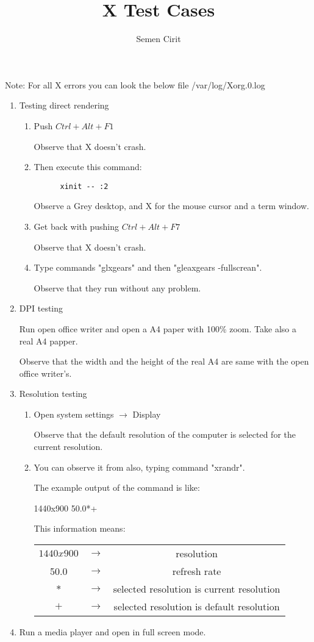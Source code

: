 \documentclass[a4paper,10pt]{article}
\title{X Test Cases}
\author{Semen Cirit}
\begin{document}
\maketitle

 Note:	
  	For all X errors you can look the below file
	/var/log/Xorg.0.log  
\begin{enumerate}
  \item Testing direct rendering
    \begin{enumerate}
    \item  Push $Ctrl+Alt+F1$
    
	    Observe that X doesn't crash.
    \item  Then execute this command:
	  \begin{verbatim}
	  xinit -- :2
	  \end{verbatim}
	  Observe a Grey desktop, and X for the mouse cursor and a term window.
    \item Get back with pushing $Ctrl+Alt+F7$
    
	  Observe that X doesn't crash.
    \item Type commands "glxgears" and then "gleaxgears -fullscrean".

	  Observe that they run without any problem.
    \end{enumerate}

  \item DPI testing
    
        Run open office writer and open a A4 paper with 100\% zoom. Take also a real A4 papper.

        Observe that the width and the height of the real A4 are same with the open office writer's.
  \item Resolution testing
     \begin{enumerate}
      \item Open system settings $\rightarrow$ Display

	Observe that the default resolution of the computer is selected for the current resolution.
      \item You can observe it from also, typing command "xrandr". 
	  
	  The example output of the command is like:
	  
	  1440x900  50.0*+
	  
	  This information means:
	  \begin{table}[h]
	  \centering
	  \begin{tabular}{|c|c|c|}
		  \hline
		  $1440x900$ & $\rightarrow$ & resolution \\
		  50.0       & $\rightarrow$ & refresh rate \\
		  $*$        & $\rightarrow$ & selected resolution is current resolution \\
		  $+$        & $\rightarrow$ & selected resolution is default resolution \\
		  \hline
	  \end{tabular} 
	  \label{tab:tbl}
	  \end{table}
    \end{enumerate}
 \item  Run a media player and open in full screen mode.


\end{enumerate}
\end{document}
